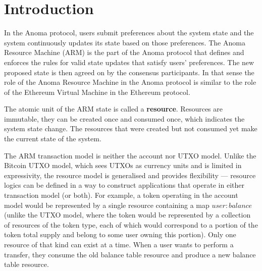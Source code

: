 \section{Introduction}

In the Anoma protocol, users submit preferences about the system state and the system continuously updates its state based on those preferences. The Anoma Resource Machine (ARM) is the part of the Anoma protocol that defines and enforces the rules for valid state updates that satisfy users' preferences. The new proposed state is then agreed on by the consensus participants. In that sense the role of the Anoma Resource Machine in the Anoma protocol is similar to the role of the Ethereum Virtual Machine in the Ethereum protocol.

The atomic unit of the ARM state is called a \textbf{resource}. Resources are immutable, they can be created once and consumed once, which indicates the system state change. The resources that were created but not consumed yet make the current state of the system.

The ARM transaction model is neither the account nor UTXO model. Unlike the Bitcoin UTXO model, which sees UTXOs as currency units and is limited in expressivity, the resource model is generalised and provides flexibility — resource logics can be defined in a way to construct applications that operate in either transaction model (or both). 
For example, a token operating in the account model would be represented by a single resource containing a map $user: balance$ (unlike the UTXO model, where the token would be represented by a collection of resources of the token type, each of which would correspond to a portion of the token total supply and belong to some user owning this portion). Only one resource of that kind can exist at a time. When a user wants to perform a transfer, they consume the old balance table resource and produce a new balance table resource.

